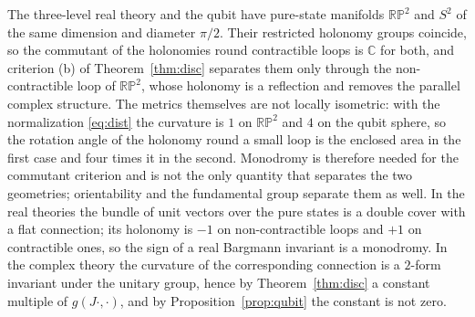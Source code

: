 \begin{remark}\label{rem:rp2}
The three-level real theory and the qubit have pure-state manifolds $\mathbb{RP}^2$ and $S^2$ of the same dimension and diameter $\pi/2$. Their restricted holonomy groups coincide, so the commutant of the holonomies round contractible loops is $\mathbb{C}$ for both, and criterion (b) of Theorem~\ref{thm:disc} separates them only through the non-contractible loop of $\mathbb{RP}^2$, whose holonomy is a reflection and removes the parallel complex structure. The metrics themselves are not locally isometric: with the normalization \eqref{eq:dist} the curvature is $1$ on $\mathbb{RP}^2$ and $4$ on the qubit sphere, so the rotation angle of the holonomy round a small loop is the enclosed area in the first case and four times it in the second. Monodromy is therefore needed for the commutant criterion and is not the only quantity that separates the two geometries; orientability and the fundamental group separate them as well. In the real theories the bundle of unit vectors over the pure states is a double cover with a flat connection; its holonomy is $-1$ on non-contractible loops and $+1$ on contractible ones, so the sign of a real Bargmann invariant is a monodromy. In the complex theory the curvature of the corresponding connection is a $2$-form invariant under the unitary group, hence by Theorem~\ref{thm:disc} a constant multiple of $g(J\cdot,\cdot)$, and by Proposition~\ref{prop:qubit} the constant is not zero.
\end{remark}


